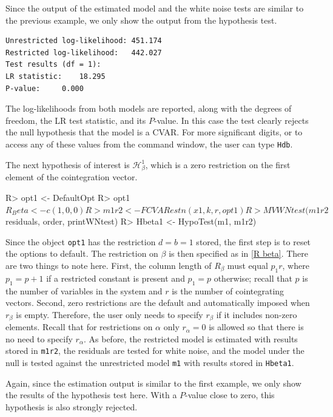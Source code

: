 \documentclass[article]{jss}
\begin{document}
Since the output of the estimated model and the white noise tests are similar to the previous example, we only show the output from the hypothesis test. 

\begin{verbatim}
Unrestricted log-likelihood: 451.174
Restricted log-likelihood:   442.027
Test results (df = 1):
LR statistic: 	 18.295
P-value: 	 0.000
\end{verbatim}

The log-likelihoods from both models are reported, along with the degrees of freedom, the LR test statistic, and its $P$-value. In this case the test clearly rejects the null hypothesis that the model is a CVAR. For more significant digits, or to access any of these values from the command window, the user can type \verb|Hdb|.

The next hypothesis of interest is $\mathscr{H}_{\beta}^1$, which is a zero restriction on the first element of the cointegration vector.

\begin{Code}
R> opt1 <- DefaultOpt
R> opt1$R_Beta <- c(1, 0, 0)
R> m1r2 <- FCVARestn(x1, k, r, opt1)
R> MVWNtest(m1r2$residuals, order, printWNtest)
R> Hbeta1 <- HypoTest(m1, m1r2)
\end{Code}

Since the object \verb|opt1| has the restriction $d=b=1$ stored, the first step is to reset the options to default. The restriction on $\beta$ is then specified as in \eqref{R beta}. There are two things to note here. First, the column length of $R_{\beta}$ must equal $p_1 r$, where $p_1=p+1$ if a restricted constant is present and $p_1=p$ otherwise; recall that $p$ is the number of variables in the system and $r$ is the number of cointegrating vectors. Second, zero restrictions are the default and automatically imposed when $r_{\beta}$ is empty. Therefore, the user only needs to specify $r_{\beta}$ if it includes non-zero elements. Recall that for restrictions on $\alpha$ only $r_\alpha = 0$ is allowed so that there is no need to specify $r_\alpha$. As before, the restricted model is estimated with results stored in \verb|m1r2|, the residuals are tested for white noise, and the model under the null is tested against the unrestricted model \verb|m1| with results stored in \verb|Hbeta1|.

Again, since the estimation output is similar to the first example, we only show the results of the hypothesis test here. With a $P$-value close to zero, this hypothesis is also strongly rejected.
\end{document}

